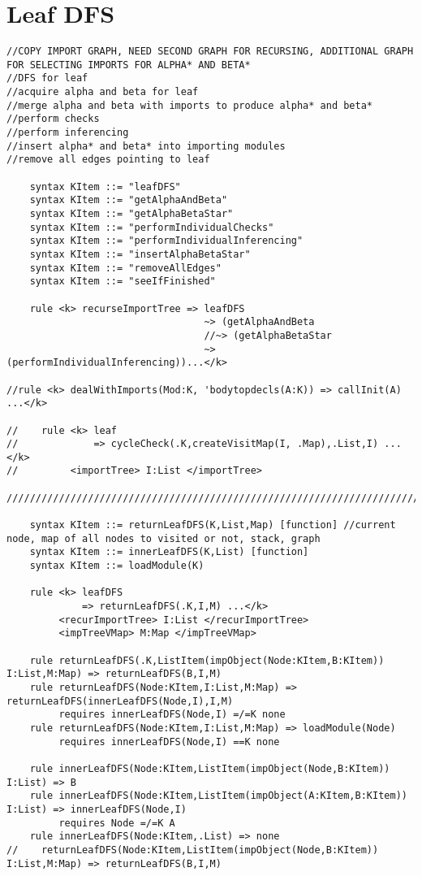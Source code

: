 \section{Leaf DFS}
\begin{lstlisting}
//COPY IMPORT GRAPH, NEED SECOND GRAPH FOR RECURSING, ADDITIONAL GRAPH FOR SELECTING IMPORTS FOR ALPHA* AND BETA*
//DFS for leaf
//acquire alpha and beta for leaf
//merge alpha and beta with imports to produce alpha* and beta*
//perform checks
//perform inferencing
//insert alpha* and beta* into importing modules
//remove all edges pointing to leaf

    syntax KItem ::= "leafDFS"
    syntax KItem ::= "getAlphaAndBeta"
    syntax KItem ::= "getAlphaBetaStar"
    syntax KItem ::= "performIndividualChecks"
    syntax KItem ::= "performIndividualInferencing"
    syntax KItem ::= "insertAlphaBetaStar"
    syntax KItem ::= "removeAllEdges"
    syntax KItem ::= "seeIfFinished"

    rule <k> recurseImportTree => leafDFS 
                                  ~> (getAlphaAndBeta
                                  //~> (getAlphaBetaStar
                                  ~> (performIndividualInferencing))...</k>

//rule <k> dealWithImports(Mod:K, 'bodytopdecls(A:K)) => callInit(A) ...</k>

//    rule <k> leaf
//             => cycleCheck(.K,createVisitMap(I, .Map),.List,I) ...</k>
//         <importTree> I:List </importTree>

////////////////////////////////////////////////////////////////////////////////////////////////////////////////////////

    syntax KItem ::= returnLeafDFS(K,List,Map) [function] //current node, map of all nodes to visited or not, stack, graph
    syntax KItem ::= innerLeafDFS(K,List) [function]
    syntax KItem ::= loadModule(K)

    rule <k> leafDFS
             => returnLeafDFS(.K,I,M) ...</k>
         <recurImportTree> I:List </recurImportTree>
         <impTreeVMap> M:Map </impTreeVMap>

    rule returnLeafDFS(.K,ListItem(impObject(Node:KItem,B:KItem)) I:List,M:Map) => returnLeafDFS(B,I,M)
    rule returnLeafDFS(Node:KItem,I:List,M:Map) => returnLeafDFS(innerLeafDFS(Node,I),I,M)
         requires innerLeafDFS(Node,I) =/=K none
    rule returnLeafDFS(Node:KItem,I:List,M:Map) => loadModule(Node)
         requires innerLeafDFS(Node,I) ==K none

    rule innerLeafDFS(Node:KItem,ListItem(impObject(Node,B:KItem)) I:List) => B
    rule innerLeafDFS(Node:KItem,ListItem(impObject(A:KItem,B:KItem)) I:List) => innerLeafDFS(Node,I)
         requires Node =/=K A
    rule innerLeafDFS(Node:KItem,.List) => none
//    returnLeafDFS(Node:KItem,ListItem(impObject(Node,B:KItem)) I:List,M:Map) => returnLeafDFS(B,I,M)



\end{lstlisting}
